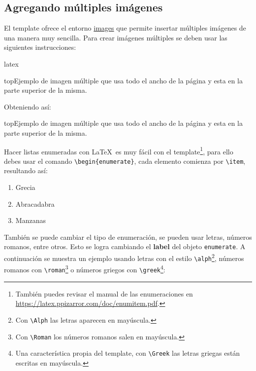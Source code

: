 \subsection{Agregando múltiples imágenes}

	El template ofrece el entorno \href{https://latex.ppizarror.com/informe.html#hlp-images}{images} que permite insertar múltiples imágenes de una manera muy sencilla. Para crear imágenes múltiples se deben usar las siguientes instrucciones:

\begin{sourcecode}{latex}{}
\begin{imagesmc}{top}{Ejemplo de imagen múltiple que usa todo el ancho de la página y esta en la parte superior de la misma.}
\end{imagesmc}
\end{sourcecode}

	Obteniendo así:

	\begin{imagesmc}{top}{Ejemplo de imagen múltiple que usa todo el ancho de la página y esta en la parte superior de la misma.}
	\end{imagesmc}




	Hacer listas enumeradas con \LaTeX\ es muy fácil con el template\footnote{También puedes revisar el manual de las enumeraciones en \url{https://latex.ppizarror.com/doc/enumitem.pdf}.}, para ello debes usar el comando \texttt{\textbackslash begin\{enumerate\}}, cada elemento comienza por \texttt{\textbackslash item}, resultando así:

	\begin{enumerate}
		\item Grecia
		\item Abracadabra
		\item Manzanas
	\end{enumerate}

	También se puede cambiar el tipo de enumeración, se pueden usar letras, números romanos, entre otros. Esto se logra cambiando el \textbf{label} del objeto \texttt{enumerate}. A continuación se muestra un ejemplo usando letras con el estilo \texttt{\textbackslash alph}\footnote{Con \texttt{\textbackslash Alph} las letras aparecen en mayúscula.}, números romanos con \texttt{\textbackslash roman}\footnote{Con \texttt{\textbackslash Roman} los números romanos salen en mayúscula.} o números griegos con \texttt{\textbackslash greek}\footnote{Una característica propia del template, con \texttt{\textbackslash Greek} las letras griegas están escritas en mayúscula.}:

